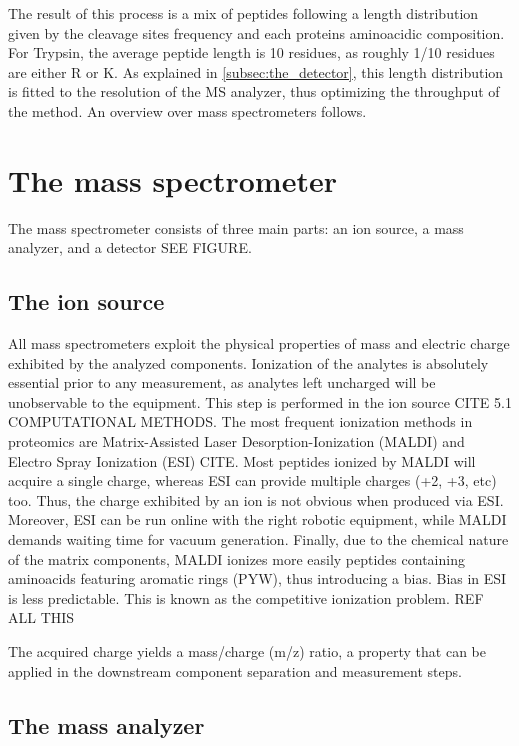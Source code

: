 \documentclass[11pt, a4paper]{report}
\begin{document}
The result of this process is a mix of peptides following a length distribution given by the cleavage sites frequency and each protein\textquotesingle s aminoacidic composition. For Trypsin, the average peptide length is 10 residues, as roughly 1/10 residues are either R or K.
As explained in \ref{subsec:the_detector}, this length distribution is fitted to the resolution of the MS analyzer, thus optimizing the throughput of the method. An overview over mass spectrometers follows.

\section{The mass spectrometer}
\label{sec:thee_mass_spectrometer}

The mass spectrometer consists of three main parts: an ion source, a mass analyzer, and a detector SEE FIGURE.

\subsection{The ion source}
\label{subsec:the_ion_source}

All mass spectrometers exploit the physical properties of mass and electric charge exhibited by the analyzed components. Ionization of the analytes is absolutely essential prior to any measurement, as analytes left uncharged will be unobservable to the equipment.
This step is performed in the ion source CITE 5.1 COMPUTATIONAL METHODS. The most frequent ionization methods in proteomics are Matrix-Assisted Laser Desorption-Ionization (MALDI) and Electro Spray Ionization (ESI) CITE. Most peptides ionized by MALDI will acquire a single charge, whereas ESI can provide multiple charges (+2, +3, etc) too. Thus, the charge exhibited by an ion is not obvious when produced via ESI. Moreover, ESI can be run online with the right robotic equipment, while MALDI demands waiting time for vacuum generation. Finally, due to the chemical nature of the matrix components, MALDI ionizes more easily peptides containing aminoacids featuring aromatic rings (PYW), thus introducing a bias. Bias in ESI is less predictable. This is known as the competitive ionization problem. REF ALL THIS

The acquired charge yields a mass/charge (\ac{m/z}) ratio, a property that can be applied in the downstream component separation and measurement steps.

\subsection{The mass analyzer}
\label{subsec:the_mass_analyzer}
\end{document}
